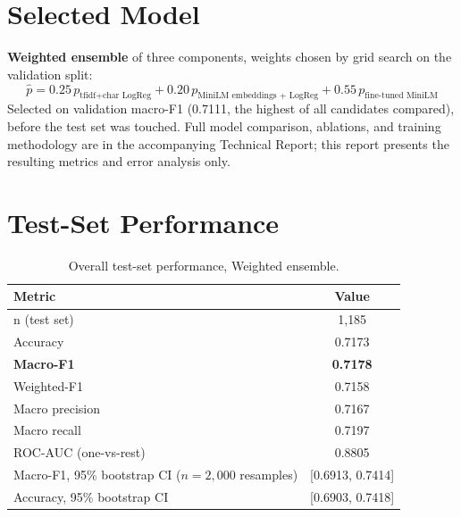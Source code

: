 \documentclass[11pt,a4paper]{article}
\begin{document}
\color{bodytext}


\tableofcontents
\newpage

\section{Selected Model}

\textbf{Weighted ensemble} of three components, weights chosen by grid search on the validation split:
\[
\hat{p} = 0.25\,p_{\text{tfidf+char LogReg}} + 0.20\,p_{\text{MiniLM embeddings + LogReg}} + 0.55\,p_{\text{fine-tuned MiniLM}}
\]
Selected on validation macro-F1 (0.7111, the highest of all candidates compared), before the test set was touched. Full model comparison, ablations, and training methodology are in the accompanying Technical Report; this report presents the resulting metrics and error analysis only.

\section{Test-Set Performance}

\begin{table}[H]
\centering
\begin{tabular}{@{}lc@{}}
\toprule
\textbf{Metric} & \textbf{Value} \\
\midrule
n (test set) & 1{,}185 \\
Accuracy & 0.7173 \\
\textbf{Macro-F1} & \textbf{0.7178} \\
Weighted-F1 & 0.7158 \\
Macro precision & 0.7167 \\
Macro recall & 0.7197 \\
ROC-AUC (one-vs-rest) & 0.8805 \\
Macro-F1, 95\% bootstrap CI ($n=2{,}000$ resamples) & [0.6913, 0.7414] \\
Accuracy, 95\% bootstrap CI & [0.6903, 0.7418] \\
\bottomrule
\end{tabular}
\caption{Overall test-set performance, Weighted ensemble.}
\end{table}
\end{document}
